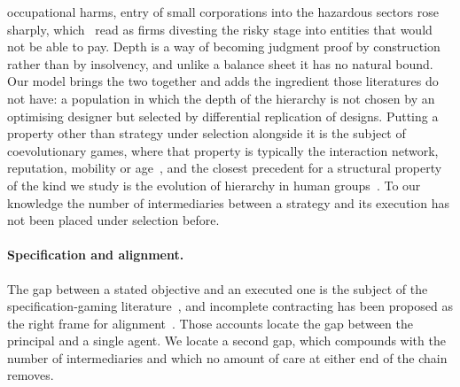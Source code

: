 \documentclass[11pt,a4paper]{article}
\theoremstyle{definition}
\begin{document}
occupational harms, entry of small corporations into the hazardous sectors rose
sharply, which~\citet{ringleb1990liability} read as firms divesting the risky
stage into entities that would not be able to pay. Depth
is a way of becoming judgment proof by construction rather than by insolvency,
and unlike a balance sheet it has no natural bound. Our model brings the
two together and adds the ingredient those literatures do not have: a
population in which the depth of the hierarchy is not chosen by an optimising
designer but selected by differential replication of designs. Putting a
property other than strategy under selection alongside it is the subject of
coevolutionary games, where that property is typically the interaction network,
reputation, mobility or age~\citep{perc2010coevolutionary}, and the closest
precedent for a structural property of the kind we study is the evolution of
hierarchy in human groups~\citep{perret2020hierarchy}. To our knowledge the
number of intermediaries between a strategy and its execution has not been
placed under selection before.

\paragraph{Specification and alignment.}
The gap between a stated objective and an executed one is the subject of the
specification-gaming literature~\citep{amodei2016concrete}, and incomplete
contracting has been proposed as the right frame for
alignment~\citep{hadfieldmenell2019incomplete}. Those accounts locate the gap
between the principal and a single agent. We locate a second gap, which
compounds with the number of intermediaries and which no amount of care at
either end of the chain removes.
\end{document}

